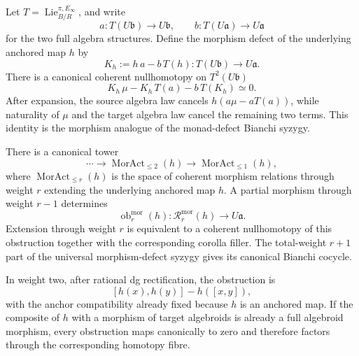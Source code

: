 \begin{construction}
\label{con:as-morphism-defect-syzygy}
Let $T=\operatorname{Lie}^{\pi,E_\infty}_{B/R}$, and write
\[
    a:T(U\mathfrak b)\to U\mathfrak b,
    \qquad
    b:T(U\mathfrak a)\to U\mathfrak a
\]
for the two full algebra structures.  Define the morphism defect of the
underlying anchored map $h$ by
\[
\boxed{
    K_h
    :=
    h\,a-b\,T(h):
    T(U\mathfrak b)\longrightarrow U\mathfrak a.
}
\]
There is a canonical coherent nullhomotopy on $T^2(U\mathfrak b)$
\[
\boxed{
    K_h\,\mu
    -K_h\,T(a)
    -b\,T(K_h)
    \simeq0.
}
\]
After expansion, the source algebra law cancels
$h(a\mu-aT(a))$, while naturality of $\mu$ and the target algebra law cancel
the remaining two terms.  This identity is the morphism analogue of the
monad-defect Bianchi syzygy.
\end{construction}

\begin{proposition}
\label{prop:as-morphism-obstruction-tower}
There is a canonical tower
\[
    \cdots\to
    \operatorname{MorAct}_{\le2}(h)
    \to
    \operatorname{MorAct}_{\le1}(h),
\]
where $\operatorname{MorAct}_{\le r}(h)$ is the space of coherent morphism
relations through weight $r$ extending the underlying anchored map $h$.  A
partial morphism through weight $r-1$ determines
\[
\boxed{
    \operatorname{ob}^{\mathrm{mor}}_r(h):
    \mathcal R_r^{\mathrm{mor}}(h)
    \longrightarrow
    U\mathfrak a.
}
\]
Extension through weight $r$ is equivalent to a coherent nullhomotopy of this
obstruction together with the corresponding corolla filler.  The total-weight
$r+1$ part of the universal morphism-defect syzygy gives its canonical Bianchi
cocycle.

In weight two, after rational dg rectification, the obstruction is
\[
    [h(x),h(y)]-h([x,y]),
\]
with the anchor compatibility already fixed because $h$ is an anchored map.
If the composite of $h$ with a morphism of target algebroids is already a full
algebroid morphism, every obstruction maps canonically to zero and therefore
factors through the corresponding homotopy fibre.
\end{proposition}

